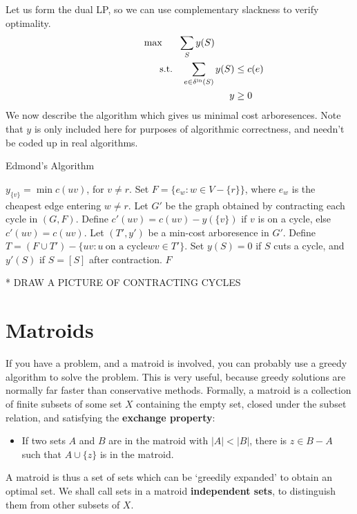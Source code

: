 Let us form the dual LP, so we can use complementary slackness to verify optimality.
%
\begin{gather*}
\max \quad\ \ \sum_S y(S) \\
\begin{aligned}
\ \ \ \ \ \ \ \ \ \ \ \ \ \ \ \ \ \ \ \ \textup{s.t.} \quad \sum_{e \in \delta^{\text{in}}(S)} y(S) &\leq c(e)\\
                  y &\geq 0
\end{aligned}
\end{gather*}
%
We now describe the algorithm which gives us minimal cost arboresences. Note that $y$ is only included here for purposes of algorithmic correctness, and needn't be coded up in real algorithms.

\begin{algorithm}
\caption{Edmond's Algorithm}
\begin{algorithmic}[1]
\State $y_{\{ v \}} = \min c(uv)$, for $v \neq r$.
\State Set $F = \{ e_w : w \in V - \{ r \} \}$, where $e_w$ is the cheapest edge entering $w \neq r$.
\State Let $G'$ be the graph obtained by contracting each cycle in $(G,F)$.
\State Define $c'(uv) = c(uv) - y(\{v\})$ if $v$ is on a cycle, else $c'(uv) = c(uv)$.
\State Let $(T',y')$ be a min-cost arboresence in $G'$.
\State Define $T = (F \cup T') - \{ uv : u\ \text{on a cycle} wv \in T' \}$.
\State Set $y(S) = 0$ if $S$ cuts a cycle, and $y'(S)$ if $S = [S]$ after contraction.
\EndWhile
\State \Return $F$
\end{algorithmic}
\end{algorithm}

* DRAW A PICTURE OF CONTRACTING CYCLES

\chapter{Matroids}

If you have a problem, and a matroid is involved, you can probably use a greedy algorithm to solve the problem. This is very useful, because greedy solutions are normally far faster than conservative methods.  Formally, a matroid is a collection of finite subsets of some set $X$ containing the empty set, closed under the subset relation, and satisfying the {\bf exchange property}:
%
\begin{itemize}
    \item If two sets $A$ and $B$ are in the matroid with $|A| < |B|$, there is $z \in B - A$ such that $A \cup \{ z \}$ is in the matroid.
\end{itemize}
%
A matroid is thus a set of sets which can be `greedily expanded' to obtain an optimal set. We shall call sets in a matroid {\bf independent sets}, to distinguish them from other subsets of $X$.

